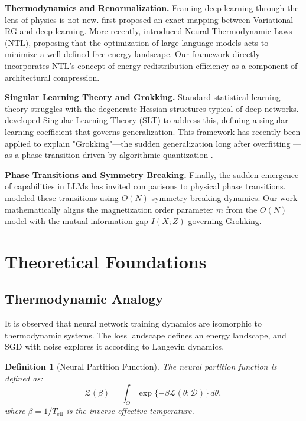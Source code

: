 \documentclass[11pt, a4paper]{article}
\newtheorem{dfn}[theo]{Definition}
\theoremstyle{plain}
\def\sZ{{\mathcal Z}}
\def\sD{{\mathcal D}}
\begin{document}
\textbf{Thermodynamics and Renormalization.} Framing deep learning through the lens of physics is not new. \citet{mehta2006renormalization} first proposed an exact mapping between Variational RG and deep learning. More recently, \citet{tegmark2505.10559} introduced Neural Thermodynamic Laws (NTL), proposing that the optimization of large language models acts to minimize a well-defined free energy landscape. Our framework directly incorporates NTL's concept of energy redistribution efficiency as a component of architectural compression.

\textbf{Singular Learning Theory and Grokking.} Standard statistical learning theory struggles with the degenerate Hessian structures typical of deep networks. \citet{watanabe2007singular,watanabe2009algebraic} developed Singular Learning Theory (SLT) to address this, defining a singular learning coefficient that governs generalization. This framework has recently been applied to explain "Grokking"---the sudden generalization long after overfitting \citep{power2022grokking}---as a phase transition driven by algorithmic quantization \citep{michaud2023quantization}.

\textbf{Phase Transitions and Symmetry Breaking.} Finally, the sudden emergence of capabilities in LLMs \citep{wei2022phase} has invited comparisons to physical phase transitions. \citet{chae2024phase} modeled these transitions using $O(N)$ symmetry-breaking dynamics. Our work mathematically aligns the magnetization order parameter $m$ from the $O(N)$ model with the mutual information gap $I(X;Z)$ governing Grokking.

\section{Theoretical Foundations}

\subsection{Thermodynamic Analogy}

It is observed that neural network training dynamics are isomorphic to thermodynamic systems. The loss landscape defines an energy landscape, and SGD with noise explores it according to Langevin dynamics.

\begin{dfn}[Neural Partition Function]\label{dfn:partition}
The neural partition function is defined as:
\begin{equation}
\sZ(\beta) = \int_{\Theta} \exp\{-\beta \mathcal{L}(\theta; \sD)\} \, d\theta,
\label{eq:partition}
\end{equation}
where $\beta = 1/T_{\text{eff}}$ is the inverse effective temperature.
\end{dfn}
\end{document}
